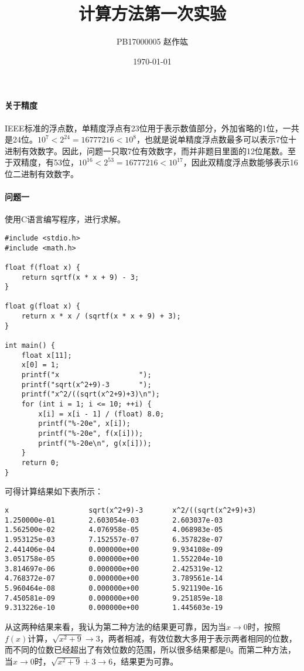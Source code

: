 \documentclass[UTF8,zihao=-4]{ctexart}
\title{\heiti 计算方法\quad 第一次实验}
\author{PB17000005\quad \CJKfontspec{AR PL UKai CN} 赵作竑}
\date{\kaishu \today}
\begin{document}
	\maketitle
	\paragraph{关于精度}IEEE标准的浮点数，单精度浮点有23位用于表示数值部分，外加省略的1位，一共是24位。$10^7<2^24=16777216<10^8$，也就是说单精度浮点数最多可以表示7位十进制有效数字。因此，问题一只取7位有效数字，而并非题目里面的12位尾数。至于双精度，有53位，$10^{16}<2^53=16777216<10^{17}$，因此双精度浮点数能够表示16位二进制有效数字。
	\paragraph{问题一} 使用C语言编写程序，进行求解。
	\begin{lstlisting}
#include <stdio.h>
#include <math.h>

float f(float x) {
    return sqrtf(x * x + 9) - 3;
}

float g(float x) {
    return x * x / (sqrtf(x * x + 9) + 3);
}

int main() {
    float x[11];
    x[0] = 1;
    printf("x                   ");
    printf("sqrt(x^2+9)-3       ");
    printf("x^2/((sqrt(x^2+9)+3)\n");
    for (int i = 1; i <= 10; ++i) {
        x[i] = x[i - 1] / (float) 8.0;
        printf("%-20e", x[i]);
        printf("%-20e", f(x[i]));
        printf("%-20e\n", g(x[i]));
    }
    return 0;
}
	\end{lstlisting}
	可得计算结果如下表所示：
	\begin{lstlisting}
x                   sqrt(x^2+9)-3       x^2/((sqrt(x^2+9)+3)
1.250000e-01        2.603054e-03        2.603037e-03        
1.562500e-02        4.076958e-05        4.068983e-05        
1.953125e-03        7.152557e-07        6.357828e-07        
2.441406e-04        0.000000e+00        9.934108e-09        
3.051758e-05        0.000000e+00        1.552204e-10        
3.814697e-06        0.000000e+00        2.425319e-12        
4.768372e-07        0.000000e+00        3.789561e-14        
5.960464e-08        0.000000e+00        5.921190e-16        
7.450581e-09        0.000000e+00        9.251859e-18        
9.313226e-10        0.000000e+00        1.445603e-19
	\end{lstlisting}
	从这两种结果来看，我认为第二种方法的结果更可靠，因为当$x\to 0$时，按照$f(x)$计算，$\sqrt{x^2+9}\to 3$，两者相减，有效位数大多用于表示两者相同的位数，而不同的位数已经超出了有效位数的范围，所以很多结果都是0。而第二种方法，当$x\to 0$时，$\sqrt{x^2+9}+3\to 6$，结果更为可靠。
\end{document}
